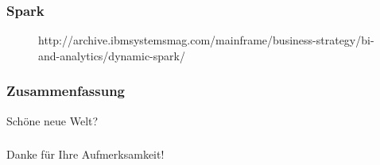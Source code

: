 \documentclass[11pt]{beamer}
\begin{document}
\begin{frame}
\frametitle{Spark}
\begin{figure}
		\caption{http://archive.ibmsystemsmag.com/mainframe/business-strategy/bi-and-analytics/dynamic-spark/}
\end{figure}
\end{frame}

\begin{frame}
\frametitle{Zusammenfassung}
\center Schöne neue Welt?
\begin{figure}
\end{figure}
\end{frame}

\begin{frame}
\frametitle{}
\center Danke für Ihre Aufmerksamkeit!
\end{frame}
\end{document}
